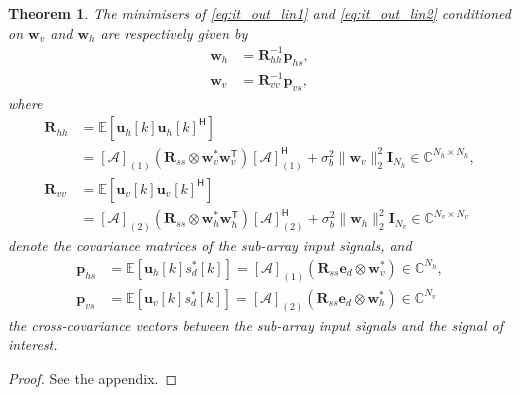 \documentclass{cta-author}
\newcommand{\mc}[1]{\ensuremath{\mathcal{#1}}}				%
\newcommand{\bmm}[1]{\ensuremath{\mathbb{#1}}}				%
\newcommand{\tran}{\mathsf{T}}						%
\newcommand{\hermit}{\mathsf{H}}					%
\newcommand{\Rss}{\bm{R}_{ss}}
\newcommand{\edes}{\bm{e}_{d}}
\newtheorem{theorem}{Theorem}
\begin{document}
\begin{theorem} \label{theorem:urra}
	The minimisers of \eqref{eq:it_out_lin1} and \eqref{eq:it_out_lin2} conditioned on $\bm{w}_v$ and $\bm{w}_h$ are respectively given by 
	\begin{align}
		\bm{w}_h &= \bm{R}_{hh}^{-1} \bm{p}_{hs}, \label{eq:mmse_h}\\
		\bm{w}_v &= \bm{R}_{vv}^{-1} \bm{p}_{vs},\label{eq:mmse_v}
	\end{align}
	where 
	\begin{align}
		\bm{R}_{hh} &= \bmm{E}\left[ \bm{u}_h[k] \bm{u}_h[k]^\hermit  \right] \\
							&= [\mc{A}]_{(1)} ( \Rss \otimes \bm{w}_v^*\bm{w}_v^\tran) [\mc{A}]_{(1)}^\hermit +\sigma_b^2 \|\bm{w}_v\|^2_2 \bm{I}_{N_h} \in \bmm{C}^{N_h \times N_h}, \label{eq:covh}\\
		\bm{R}_{vv}  &= \bmm{E}\left[ \bm{u}_v[k] \bm{u}_v[k]^\hermit  \right] \\
							&= [\mc{A}]_{(2)} ( \Rss \otimes \bm{w}_h^*\bm{w}_h^\tran) [\mc{A}]_{(2)}^\hermit + \sigma_b^2 \|\bm{w}_h\|^2_2 \bm{I}_{N_v} \in \bmm{C}^{N_v \times N_v} \label{eq:covv}
	\end{align}
	denote the covariance matrices of the sub-array input signals, and
	\begin{align}
		\bm{p}_{hs} &= \bmm{E}\left[ \bm{u}_h[k] s_d^*[k] \right] = [\mc{A}]_{(1)} ( \Rss\edes \otimes \bm{w}_v^*) \in \bmm{C}^{N_h}, \label{eq:crosscorrh}\\
		\bm{p}_{vs} &= \bmm{E}\left[ \bm{u}_v[k] s_d^*[k] \right] = [\mc{A}]_{(2)} ( \Rss\edes \otimes \bm{w}_h^*) \in \bmm{C}^{N_v} \label{eq:crosscorrv}
	\end{align}
	the cross-covariance vectors between the sub-array input signals and the signal of interest.	
\end{theorem} 
\begin{proof} \renewcommand{\qedsymbol}{}
	See the appendix.
\end{proof}
\end{document}
